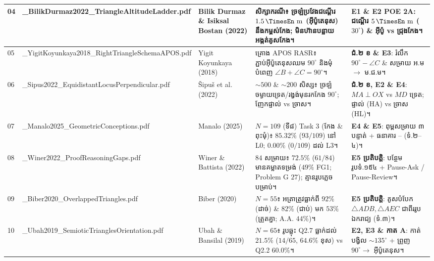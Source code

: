 \documentclass[a4paper,12pt]{article}
\newcommand{\en}[1]{{\TimesEn #1}}
\newcommand{\unit}[1]{\,\text{\en{#1}}}
\newcommand{\cnum}[1]{\text{\fontsize{10.5pt}{12pt}\selectfont\ding{\numexpr181+#1\relax}}}
\newcommand{\tri}[1]{\ensuremath{\triangle #1}}
\newcommand{\ang}[1]{\ensuremath{\angle #1}}
\begin{document}
\begin{longtable}{|C{0.65cm}|L{4.10cm}|L{2.80cm}|L{5.15cm}|L{3.80cm}|}
04 & \en{04\_\allowbreak BilikDurmaz2022\_\allowbreak TriangleAltitude\allowbreak Ladder.pdf} & \en{Bilik Durmaz \& Isiksal Bostan (2022)} &
សិក្សាករណី៖ ច្រឡំប្រវែងជណ្ដើរ $1.5\unit{m}$ (អ៊ីប៉ូតេនុស) នឹងកម្ពស់កែង; មិនហ៊ានបន្លាយអង្កត់គូសកែង។ &
\textbf{E1 \& E2 POE 2A}: ជណ្ដើរ $5\unit{m}$ ($30^\circ$) \& អ៊ីប៉ូ vs ជ្រុងកែង។ \\ \hline

05 & \en{05\_\allowbreak YigitKoyunkaya2018\_\allowbreak RightTriangle\allowbreak SchemaAPOS.pdf} & \en{Yigit Koyunkaya (2018)} &
គ្រោង \en{APOS RASR}៖ ភ្ជាប់អ៊ីប៉ូតេនុសឈម $90^\circ$ និងមុំបំពេញ $\ang{B}+\ang{C}=90^\circ$។ &
\textbf{ជំ.២ ខ \& E3}: រំលឹក $90^\circ{-}\ang{C}$ \& សម្រាយ អ.ម $\to$ ម.ជ.ម។ \\ \hline

06 & \en{06\_\allowbreak Sipus2022\_\allowbreak EquidistantLocus\allowbreak Perpendicular.pdf} & \en{\v{S}ipu\v{s} et al. (2022)} &
$\sim 500$ \& $\sim 200$ សិស្ស៖ ច្រឡំចម្ងាយទ្រេត/រង្វង់មុនរកកែង $90^\circ$; ញែកផ្ទាល់ vs ច្រាស។ &
\textbf{ជំ.២ ខ, E2 \& E4}: $MA\perp OX$ vs $MD$ ទ្រេត; ផ្ទាល់ (\en{HA}) vs ច្រាស (\en{HL})។ \\ \hline

07 & \en{07\_\allowbreak Manalo2025\_\allowbreak Geometric\allowbreak Conceptions.pdf} & \en{Manalo (2025)} &
$N=109$ (ទី៨) \en{Task 3} (កែង \& ពុះមុំ)៖ $85.32\%$ ($93/109$) នៅ \en{L0}; $0.00\%$ ($0/109$) ដល់ \en{L3}។ &
\textbf{E4 \& E5}: ពុម្ពសម្រាយ ៣ បន្ទាត់ + ធនាគារ \cnum{1}--\cnum{5} (ទំ.២--៤)។ \\ \hline

08 & \en{08\_\allowbreak Winer2022\_\allowbreak ProofReasoning\allowbreak Gaps.pdf} & \en{Winer \& Battista (2022)} &
$84$ សម្រាយ៖ $72.5\%$ ($61/84$) មានគម្លាតទម្រង់ ($49\%$ \en{FG1}; \en{Problem G} $27$); គ្មានរូបភ្លេចបម្រាប់។ &
\textbf{E5 ប្រតិបត្តិ}: បន្ថែមរូបទំ.១៥៤ + \en{Pause-Ask / Pause-Review}។ \\ \hline

09 & \en{09\_\allowbreak Biber2020\_\allowbreak Overlapped\allowbreak Triangles.pdf} & \en{Biber (2020)} &
$N=55$៖ អត្រាត្រូវធ្លាក់ពី $92\%$ (ដាច់) \& $82\%$ (ជាប់) មក $53\%$ (ត្រួតគ្នា; \en{A.A.} $44\%$)។ &
\textbf{E5 ប្រតិបត្តិ}: គូសបំបែក $\tri{ADB}, \tri{AEC}$ ជាពីររូបឯករាជ្យ (ទំ.៣)។ \\ \hline

10 & \en{10\_\allowbreak Ubah2019\_\allowbreak SemioticTriangles\allowbreak Orientation.pdf} & \en{Ubah \& Bansilal (2019)} &
$N=65$៖ រូបឆ្លុះ \en{Q2.7} ធ្លាក់ដល់ $21.5\%$ ($14/65$, $64.6\%$ ខុស) vs \en{Q2.2} $60.0\%$។ &
\textbf{E2, E3 \& កាត A}: កាត់បង្វិល $\sim 135^\circ$ + ព្រួញ $90^\circ\to$ អ៊ីប៉ូតេនុស។ \\ \hline


\end{longtable}
\end{document}
